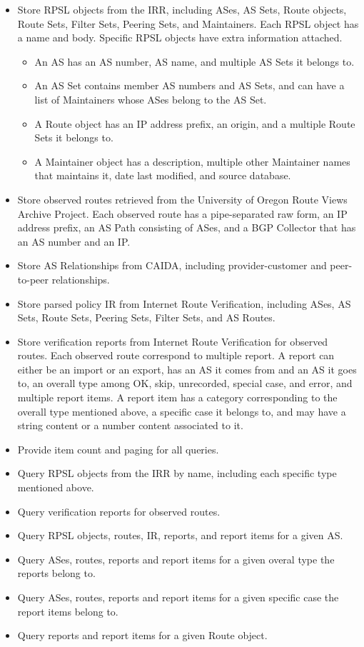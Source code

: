 \documentclass[12pt]{article}
\begin{document}
\begin{itemize}
    \item Store RPSL objects from the IRR,
    including ASes, AS Sets, Route objects, Route Sets, Filter Sets,
    Peering Sets, and Maintainers.
    Each RPSL object has a name and body.
    Specific RPSL objects have extra information attached.
    \begin{itemize}
        \item An AS has an AS number, AS name, and
        multiple AS Sets it belongs to.
        \item An AS Set contains member AS numbers and AS Sets, and
        can have a list of Maintainers whose ASes belong to the AS Set.
        \item A Route object has an IP address prefix, an origin, and
        a multiple Route Sets it belongs to.
        \item A Maintainer object has a description,
        multiple other Maintainer names that maintains it,
        date last modified, and source database.
    \end{itemize}
    \item Store observed routes retrieved from the University of
    Oregon Route Views Archive Project.
    Each observed route has a pipe-separated raw form,
    an IP address prefix, an AS Path consisting of ASes,
    and a BGP Collector that has an AS number and an IP.
    \item Store AS Relationships from CAIDA,
    including provider-customer and peer-to-peer relationships.
    \item Store parsed policy IR from Internet Route Verification,
    including ASes, AS Sets, Route Sets, Peering Sets, Filter Sets, and
    AS Routes.
    \item Store verification reports from Internet Route Verification for
    observed routes.
    Each observed route correspond to multiple report.
    A report can either be an import or an export,
    has an AS it comes from and an AS it goes to,
    an overall type among OK, skip, unrecorded, special case, and error,
    and multiple report items.
    A report item has a category corresponding to
    the overall type mentioned above,
    a specific case it belongs to,
    and may have a string content or a number content associated to it.
    \item Provide item count and paging for all queries.
    \item Query RPSL objects from the IRR by name,
    including each specific type mentioned above.
    \item Query verification reports for observed routes.
    \item Query RPSL objects, routes, IR, reports,
    and report items for a given AS.
    \item Query ASes, routes, reports and report items for a given
    overal type the reports belong to.
    \item Query ASes, routes, reports and report items for a given
    specific case the report items belong to.
    \item Query reports and report items for a given Route object.
\end{itemize}
\end{document}
